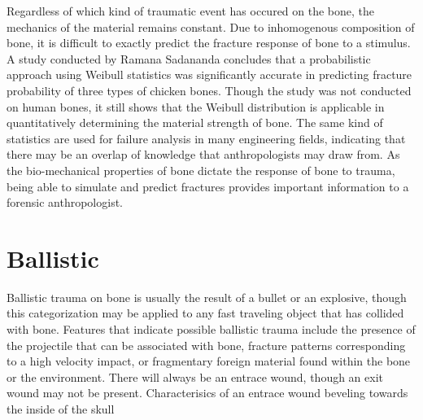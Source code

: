 \documentclass[titlepage]{article}
\begin{document}
Regardless of which kind of traumatic event has occured on the bone, the mechanics of the material remains constant. Due to inhomogenous composition of bone, it is difficult to exactly predict the fracture response of bone to a stimulus. A study conducted by Ramana Sadananda concludes that a probabilistic approach using Weibull statistics was significantly accurate in predicting fracture probability of three types of chicken bones.\cite{fracture-analysis} Though the study was not conducted on human bones, it still shows that the Weibull distribution is applicable in quantitatively determining the material strength of bone. The same kind of statistics are used for failure analysis in many engineering fields, indicating that there may be an overlap of knowledge that anthropologists may draw from. As the bio-mechanical properties of bone dictate the response of bone to trauma, being able to simulate and predict fractures provides important information to a forensic anthropologist.

\newpage
\section{Ballistic}
Ballistic trauma on bone is usually the result of a bullet or an explosive, though this categorization may be applied to any fast traveling object that has collided with bone. Features that indicate possible ballistic trauma include the presence of the projectile that can be associated with bone, fracture patterns corresponding to a high velocity impact, or fragmentary foreign material found within the bone or the environment. There will always be an entrace wound, though an exit wound may not be present. Characterisics of an entrace wound beveling towards the inside of the skull
\end{document}
